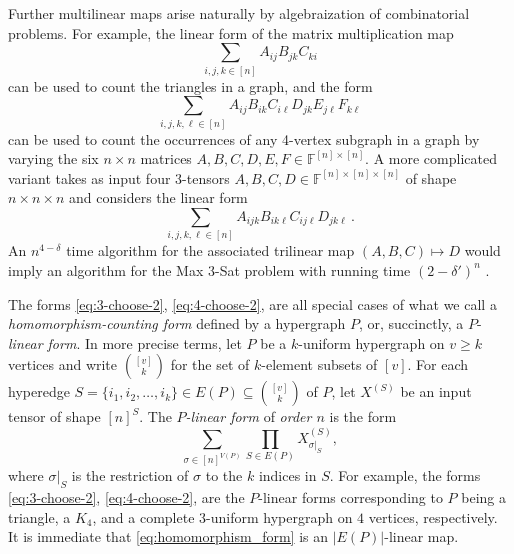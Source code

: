\documentclass{toc}
\newcommand{\F}{\ensuremath{\mathbb{F}}}
\begin{document}
Further multilinear %
%
maps
%
arise
naturally by algebraization of combinatorial problems. For example,
the linear form of the matrix multiplication map
\begin{equation}
\label{eq:3-choose-2}
\sum_{i,j,k\in [n]}A_{ij}B_{jk}C_{ki}
\end{equation}
can be used to count the %
triangles in a graph, and the form
\begin{equation}
\label{eq:4-choose-2}
\sum_{i,j,k,\ell\in [n]}
A_{ij}B_{ik}C_{i\ell}D_{jk}E_{j\ell}F_{k\ell}
\end{equation}
can be used to count the %
occurrences of any 4-vertex subgraph in
a graph by varying the six $n\times n$ matrices
$A,B,C,D,E,F\in\F^{[n]\times [n]}$. A more complicated
variant takes as input four $3$-tensors
$A, B, C, D \in\F^{[n]\times [n]\times [n]}$
of shape $n\times n\times n$ and considers the linear form
\begin{equation}
\label{eq:4-choose-3}
\sum_{i,j,k,\ell\in [n]}
A_{ijk}B_{ik\ell}C_{ij\ell}D_{jk\ell}\,.
\end{equation}
An $n^{4-\delta}$ time algorithm for the associated trilinear map $(A, B, C) \mapsto D$ would imply an algorithm for the Max 3-Sat problem with running time $(2-\delta')^n$ \cite{Williams2005}.

The forms \eqref{eq:3-choose-2}, \eqref{eq:4-choose-2},  are all special cases of what we call a \emph{homomorphism-counting form}
defined by a hypergraph $P$, or, succinctly, a $P$-\emph{linear form}.
In more precise terms, let $P$ be a $k$-uniform hypergraph on $v \ge k$ vertices and write $\binom{[v]}{k}$ for the set of $k$-element subsets of $[v]$.  For each hyperedge $S=\{i_1,i_2,\ldots,i_k\} \in E(P)\subseteq \binom{[v]}{k}$ of $P$, let $X^{(S)}$ be an input tensor of shape $[n]^S$.  The \emph{$P$-linear form} of \emph{order $n$} is the form
\begin{equation} \label{eq:homomorphism_form}
\sum_{\sigma \in [n]^{V(P)}} \prod_{S \in E(P)} X^{(S)}_{\sigma|_S},
\end{equation}
where $\sigma|_S$ is the restriction of $\sigma$ to the $k$ indices in $S$.
For example, the forms \eqref{eq:3-choose-2}, \eqref{eq:4-choose-2},  are the $P$-linear forms corresponding to $P$ being a triangle, a $K_4$, and a complete $3$-uniform hypergraph on $4$ vertices, respectively.
It is immediate that \eqref{eq:homomorphism_form} is an $|E(P)|$-linear map.
\end{document}
